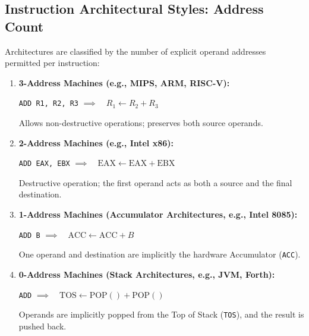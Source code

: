 \subsection{Instruction Architectural Styles: Address Count}
Architectures are classified by the number of explicit operand addresses permitted per instruction:
\begin{enumerate}[label=\bfseries\arabic*.]
    \item \textbf{3-Address Machines (e.g., MIPS, ARM, RISC-V):}
    \begin{center}
    \texttt{ADD R1, R2, R3} \quad $\implies \quad R_1 \leftarrow R_2 + R_3$
    \end{center}
    Allows non-destructive operations; preserves both source operands.
    \item \textbf{2-Address Machines (e.g., Intel x86):}
    \begin{center}
    \texttt{ADD EAX, EBX} \quad $\implies \quad \text{EAX} \leftarrow \text{EAX} + \text{EBX}$
    \end{center}
    Destructive operation; the first operand acts as both a source and the final destination.
    \item \textbf{1-Address Machines (Accumulator Architectures, e.g., Intel 8085):}
    \begin{center}
    \texttt{ADD B} \quad $\implies \quad \text{ACC} \leftarrow \text{ACC} + B$
    \end{center}
    One operand and destination are implicitly the hardware Accumulator (\texttt{ACC}).
    \item \textbf{0-Address Machines (Stack Architectures, e.g., JVM, Forth):}
    \begin{center}
    \texttt{ADD} \quad $\implies \quad \text{TOS} \leftarrow \text{POP}() + \text{POP}()$
    \end{center}
    Operands are implicitly popped from the Top of Stack (\texttt{TOS}), and the result is pushed back.
\end{enumerate}

